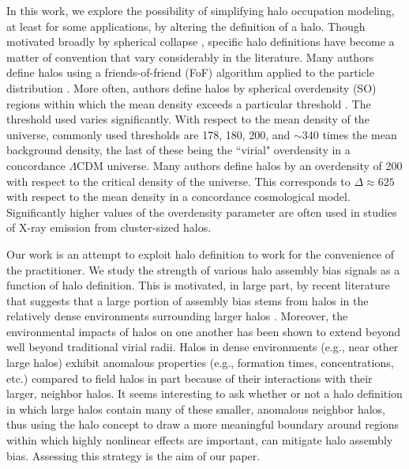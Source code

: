 \documentclass[usenatbib,fleqn]{mnras}
\begin{document}
In this work, we explore the possibility of simplifying halo occupation modeling, at least for some 
applications, by altering the definition of a halo. Though motivated broadly by spherical collapse \citep{gunn_gott72, fillmore_goldreich84, ryden_gunn87, lacey_cole93, eke_etal96, mota_vandebruck04, pace_etal10}, specific halo definitions have become a matter of convention that vary considerably in the literature. Many authors define halos using a friends-of-friend (FoF) algorithm applied to the particle distribution \citep{davis_etal85, knebe_etal11}. More often, authors define halos by spherical overdensity (SO) regions within which the mean density exceeds a particular threshold \citep{knebe_etal11}. The threshold used varies significantly. With respect to the mean density of the universe, commonly used thresholds are 178, 180, 200, and $\sim$340 times the mean background density, the last of these being the ``virial" overdensity in a concordance $\Lambda$CDM universe. Many authors define halos by an overdensity of 200 with respect to the critical density of the universe. This corresponds to $\Delta \approx 625$ with respect to the mean density in a concordance cosmological model. Significantly higher values of the overdensity parameter are often used in studies of X-ray emission from cluster-sized halos.


Our work is an attempt to exploit halo definition to work for the 
convenience of the practitioner. We study the strength of various halo assembly bias signals as a function of halo definition. This is motivated, in large part, by recent literature that suggests 
that a large portion of assembly bias stems from halos in the relatively dense environments surrounding larger halos \citep{wang_etal07, warnick_etal08, more_etal15,sunayama_etal16}. Moreover, 
the environmental impacts of halos on one another has been shown to extend beyond well beyond traditional virial radii. 
\citep{adhikari_etal14, diemer_kravtsov14, wetzel_etal14, more_etal15, wetzel_nagai15} Halos in dense environments (e.g., near other large halos) exhibit anomalous properties 
(e.g., formation times, concentrations, etc.) compared to field halos 
in part because of their interactions with their larger, neighbor halos. It seems interesting to ask 
whether or not a halo definition in which large halos contain many of these smaller, anomalous neighbor halos, thus 
using the halo concept to draw a more meaningful boundary around regions within which highly nonlinear effects are important, can mitigate halo assembly bias. Assessing this strategy is the aim of our paper. 
\end{document}
